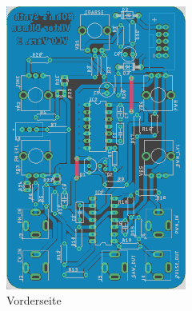 
\begin{figure}[h]
	\centering
	\begin{subfigure}{.5\textwidth}
		\centering
		\includegraphics[width=0.65\textwidth]{figures/VCO_Layout_Front}
		\caption{Vorderseite}
		\label{fig:VCO_Leiterplatte_vorne}
	\end{subfigure}%
	\begin{subfigure}{.5\textwidth}
		\centering

\end{subfigure}
\end{figure}
